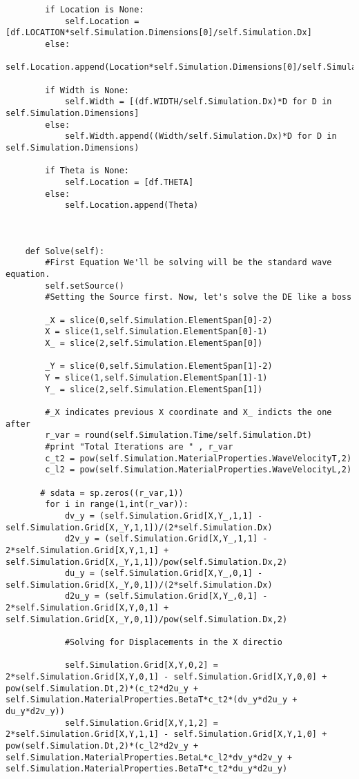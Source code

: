 \begin{lstlisting}
        if Location is None:
            self.Location = [df.LOCATION*self.Simulation.Dimensions[0]/self.Simulation.Dx]
        else:
            self.Location.append(Location*self.Simulation.Dimensions[0]/self.Simulation.Dx)

        if Width is None:
            self.Width = [(df.WIDTH/self.Simulation.Dx)*D for D in self.Simulation.Dimensions]
        else:
            self.Width.append((Width/self.Simulation.Dx)*D for D in self.Simulation.Dimensions)
            
        if Theta is None:
            self.Location = [df.THETA]
        else:
            self.Location.append(Theta)

        
    
    def Solve(self):
        #First Equation We'll be solving will be the standard wave equation.
        self.setSource()
        #Setting the Source first. Now, let's solve the DE like a boss
        
        _X = slice(0,self.Simulation.ElementSpan[0]-2)
        X = slice(1,self.Simulation.ElementSpan[0]-1)
        X_ = slice(2,self.Simulation.ElementSpan[0])
        
        _Y = slice(0,self.Simulation.ElementSpan[1]-2)
        Y = slice(1,self.Simulation.ElementSpan[1]-1)
        Y_ = slice(2,self.Simulation.ElementSpan[1])

        #_X indicates previous X coordinate and X_ indicts the one after
        r_var = round(self.Simulation.Time/self.Simulation.Dt)
        #print "Total Iterations are " , r_var
        c_t2 = pow(self.Simulation.MaterialProperties.WaveVelocityT,2)
        c_l2 = pow(self.Simulation.MaterialProperties.WaveVelocityL,2)

       # sdata = sp.zeros((r_var,1))
        for i in range(1,int(r_var)):
            dv_y = (self.Simulation.Grid[X,Y_,1,1] - self.Simulation.Grid[X,_Y,1,1])/(2*self.Simulation.Dx)
            d2v_y = (self.Simulation.Grid[X,Y_,1,1] - 2*self.Simulation.Grid[X,Y,1,1] + self.Simulation.Grid[X,_Y,1,1])/pow(self.Simulation.Dx,2)
            du_y = (self.Simulation.Grid[X,Y_,0,1] - self.Simulation.Grid[X,_Y,0,1])/(2*self.Simulation.Dx)
            d2u_y = (self.Simulation.Grid[X,Y_,0,1] - 2*self.Simulation.Grid[X,Y,0,1] + self.Simulation.Grid[X,_Y,0,1])/pow(self.Simulation.Dx,2)

            #Solving for Displacements in the X directio
            
            self.Simulation.Grid[X,Y,0,2] = 2*self.Simulation.Grid[X,Y,0,1] - self.Simulation.Grid[X,Y,0,0] + pow(self.Simulation.Dt,2)*(c_t2*d2u_y + self.Simulation.MaterialProperties.BetaT*c_t2*(dv_y*d2u_y + du_y*d2v_y))
            self.Simulation.Grid[X,Y,1,2] = 2*self.Simulation.Grid[X,Y,1,1] - self.Simulation.Grid[X,Y,1,0] + pow(self.Simulation.Dt,2)*(c_l2*d2v_y + self.Simulation.MaterialProperties.BetaL*c_l2*dv_y*d2v_y + self.Simulation.MaterialProperties.BetaT*c_t2*du_y*d2u_y)
 

\end{lstlisting}
